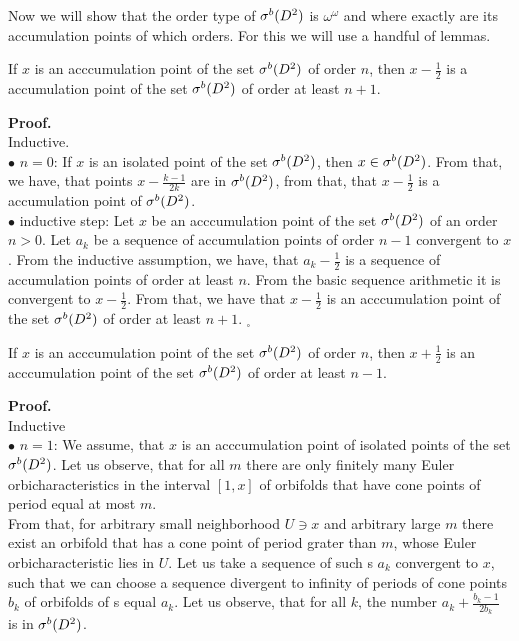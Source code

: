 Now we will show that the order type of ${\mathcal{\sigma}^b(D^2)}$ is $\omega^\omega$ and where exactly are 
its accumulation points of which orders. For this we will use  
a handful of lemmas. 

\begin{lemma}\label{first_order_lemma}
If $x$ is an acccumulation point of the set ${\mathcal{\sigma}^b(D^2)}$ of order $n$, then $x-\frac{1}{2}$ is a
 accumulation point of the set ${\mathcal{\sigma}^b(D^2)}$ of order at least $n+1$. 
\end{lemma}
\textbf{Proof.} \\
Inductive. \\
$\bullet$ $n = 0$: If $x$ is an isolated point of the set ${\mathcal{\sigma}^b(D^2)}$, then $x \in {\mathcal{\sigma}^b(D^2)}$. From that, we 
have, that points $x - \frac{k-1}{2k}$ are in ${\mathcal{\sigma}^b(D^2)}$, from that, that $x-\frac{1}{2}$ is a 
accumulation point of ${\mathcal{\sigma}^b(D^2)}$. \\
$\bullet$ inductive step: Let $x$ be an acccumulation point of the set ${\mathcal{\sigma}^b(D^2)}$ of an order $n > 0$. 
Let $a_k$ be a sequence of accumulation points of order $n-1$ convergent to $x$. From the 
inductive assumption, we have, that $a_k - \frac{1}{2}$ is a sequence of accumulation points 
of order at least $n$. From the basic sequence arithmetic it is convergent to $x-\frac{1}{2}$. 
From that, we have that $x-\frac{1}{2}$ is an acccumulation point of the set ${\mathcal{\sigma}^b(D^2)}$ of order 
at least $n+1$. $_\square$
\begin{lemma}\label{second_order_lemma}
If $x$ is an acccumulation point of the set ${\mathcal{\sigma}^b(D^2)}$ of order $n$, then $x+\frac{1}{2}$ is 
an acccumulation point of the set ${\mathcal{\sigma}^b(D^2)}$ of order at least $n-1$.  
\end{lemma}
\noindent\textbf{Proof.} \\
Inductive \\
$\bullet$ $n = 1$: We assume, that $x$ is an acccumulation point of isolated points of the set 
${\mathcal{\sigma}^b(D^2)}$. Let us observe, that for all $m$ there are only finitely many Euler orbicharacteristics 
in the interval $[1,x]$ of orbifolds that have cone points of period equal at most $m$. \\ 
From that, for arbitrary small neighborhood $U \ni x$ and arbitrary large $m$ there exist an orbifold 
that has a cone point of period grater than $m$, whose Euler orbicharacteristic lies in $U$. 
Let us take a sequence of such \Eoc s $a_k$ convergent to $x$, such that we can choose 
a sequence divergent to infinity of periods of cone points $b_k$ of orbifolds of \Eoc s equal $a_k$. 
Let us observe, that for all $k$, the number $a_k+\frac{b_k-1}{2b_k}$ is in ${\mathcal{\sigma}^b(D^2)}$. 
